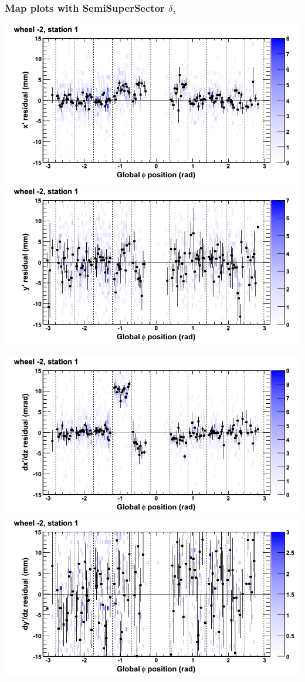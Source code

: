 \documentclass[compress]{beamer}
\begin{document}
\begin{frame}
\frametitle{Map plots with SemiSuperSector $\delta_z$}
\includegraphics[width=0.5\linewidth]{zfit_mapplots/DTvsphi_st1whA_x.png}
\includegraphics[width=0.5\linewidth]{zfit_mapplots/DTvsphi_st1whA_y.png}

\includegraphics[width=0.5\linewidth]{zfit_mapplots/DTvsphi_st1whA_dxdz.png}
\includegraphics[width=0.5\linewidth]{zfit_mapplots/DTvsphi_st1whA_dydz.png}
\end{frame}
\end{document}
